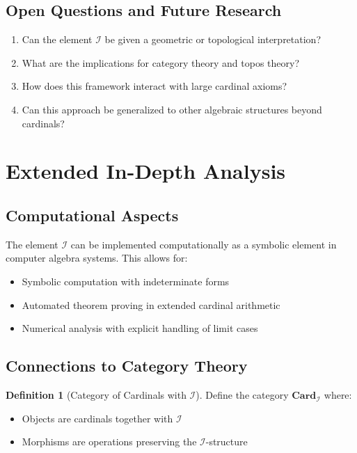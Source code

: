 \documentclass[12pt,a4paper]{article}
\theoremstyle{definition}
\newtheorem{definition}[theorem]{Definition}
\theoremstyle{remark}
\begin{document}
\subsection{Open Questions and Future Research}

\begin{enumerate}
\item Can the element $\mathcal{I}$ be given a geometric or topological interpretation?
\item What are the implications for category theory and topos theory?
\item How does this framework interact with large cardinal axioms?
\item Can this approach be generalized to other algebraic structures beyond cardinals?
\end{enumerate}

\section{Extended In-Depth Analysis}

\subsection{Computational Aspects}

The element $\mathcal{I}$ can be implemented computationally as a symbolic element in computer algebra systems. This allows for:
\begin{itemize}
\item Symbolic computation with indeterminate forms
\item Automated theorem proving in extended cardinal arithmetic
\item Numerical analysis with explicit handling of limit cases
\end{itemize}

\subsection{Connections to Category Theory}

\begin{definition}[Category of Cardinals with $\mathcal{I}$]
Define the category $\mathbf{Card}_{\mathcal{I}}$ where:
\begin{itemize}
\item Objects are cardinals together with $\mathcal{I}$
\item Morphisms are operations preserving the $\mathcal{I}$-structure
\end{itemize}
\end{definition}
\end{document}
